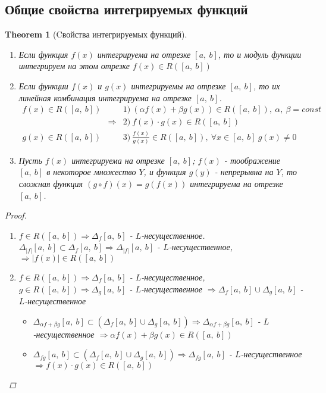 \documentclass[a4paper,12pt]{bookest}
\newtheorem{theorem}{Theorem}[section]
\theoremstyle{remark}
\begin{document}
\subsection{Общие свойства интегрируемых функций}
\begin{theorem}[Cвойства интегрируемых функций]$ $ 
	\begin{enumerate}
		\item Если функция $f(x)$ интегрируема на отрезке $[a,\>b]$, то и модуль функции интегрируем на этом отрезке $f(x)\in R([a,\>b])$
		\item Если функции $f(x)$ и $g(x)$   интегрируемы на отрезке $[a,\>b]$, то их линейная комбинация интегрируема на отрезке $[a,\>b]$.\\ $\begin{array}{ccl}
			f(x)\in R([a,\>b]) &&1)\>(\alpha f(x)+\beta g(x))\in R([a,\>b]),\>\alpha,\>\beta =const\\
			&\Rightarrow&2)\>f(x)\cdot g(x)\in R([a,\>b])\\
			g(x)\in R([a,\>b])&&3)\>\frac{f(x)}{g(x)}\in  R([a,\>b]),\>\forall x\in[a,\>b]\>g(x)\ne0
		\end{array}$
		\item Пусть $f(x)$ интегрируема на отрезке $[a,\>b]$; $f(x)$ - тоображение $[a,\>b]$ в некоторое множество $Y$, и функция $g(y)$ - непрерывна на $Y$, то сложная функция $(g\circ f)(x)=g(f(x))$ интегрируема на отрезке $[a,\>b]$.
	\end{enumerate}
	\begin{proof}$ $ 
		\begin{enumerate}
			\item $f\in R([a,\>b])\Rightarrow\Delta _f[a,\>b]$ - $L$-несущественное. $\Delta_{|f|}[a,\>b]\subset \Delta_ f[a,\>b]\Rightarrow\Delta_{|f|}[a,\>b]$ - $L$-несущественное,$\Rightarrow|f(x)|\in R([a,\>b])$
			\item $f\in R([a,\>b])\Rightarrow \Delta_f[a,\>b]$ - $L$-несущественное, $g\in R([a,\>b])\Rightarrow\Delta_g[a,\>b]$ - $L$-несущественное $\Rightarrow\Delta_f[a,\>b]\cup\Delta_g[a,\>b]$ - $L$-несущественное 
				\begin{itemize}
					\item [1.] $\Delta_{\alpha f+\beta g}[a,\>b]\subset (\Delta_f[a,\>b]\cup\Delta_g[a,\>b])\Rightarrow\Delta_{\alpha f+\beta g}[a,\>b]$ - $L$-несущественное $\Rightarrow\alpha f(x)+\beta g(x)\in R([a,\>b])$
					\item [2.] $\Delta_{fg}[a,\>b]\subset(\Delta_f[a,\>b]\cup\Delta_g[a,\>b])\Rightarrow\Delta_{fg}[a,\>b]$ - $L$-несущественное\\ $\Rightarrow f(x)\cdot g(x)\in R([a,\>b])$

\end{itemize}
\end{enumerate}
\end{proof}
\end{theorem}
\end{document}
